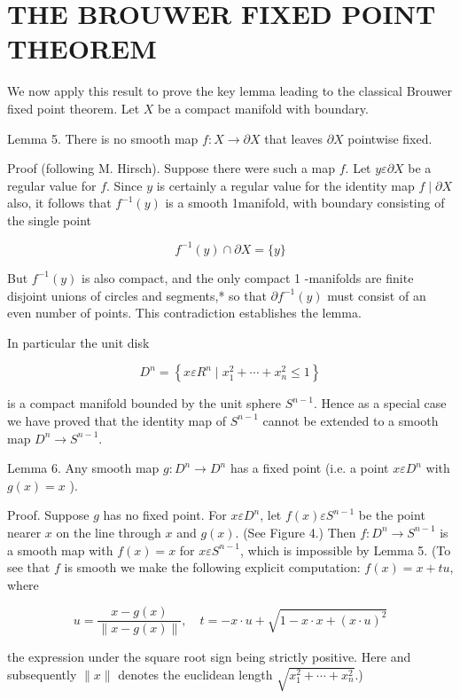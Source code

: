 \documentclass[10pt, letterpaper]{article}
\begin{document}
\section*{THE BROUWER FIXED POINT THEOREM}
We now apply this result to prove the key lemma leading to the classical Brouwer fixed point theorem. Let $X$ be a compact manifold with boundary.

Lemma 5. There is no smooth map $f: X \rightarrow \partial X$ that leaves $\partial X$ pointwise fixed.

Proof (following M. Hirsch). Suppose there were such a map $f$. Let $y \varepsilon \partial X$ be a regular value for $f$. Since $y$ is certainly a regular value for the identity map $f \mid \partial X$ also, it follows that $f^{-1}(y)$ is a smooth 1manifold, with boundary consisting of the single point

$$
f^{-1}(y) \cap \partial X=\{y\}
$$

But $f^{-1}(y)$ is also compact, and the only compact 1 -manifolds are finite disjoint unions of circles and segments,* so that $\partial f^{-1}(y)$ must consist of an even number of points. This contradiction establishes the lemma.

In particular the unit disk

$$
D^{n}=\left\{x \varepsilon R^{n} \mid x_{1}^{2}+\cdots+x_{n}^{2} \leq 1\right\}
$$

is a compact manifold bounded by the unit sphere $S^{n-1}$. Hence as a special case we have proved that the identity map of $S^{n-1}$ cannot be extended to a smooth map $D^{n} \rightarrow S^{n-1}$.

Lemma 6. Any smooth map $g: D^{n} \rightarrow D^{n}$ has a fixed point (i.e. a point $x \varepsilon D^{n}$ with $g(x)=x$ ).

Proof. Suppose $g$ has no fixed point. For $x \varepsilon D^{n}$, let $f(x) \varepsilon S^{n-1}$ be the point nearer $x$ on the line through $x$ and $g(x)$. (See Figure 4.) Then $f: D^{n} \rightarrow S^{n-1}$ is a smooth map with $f(x)=x$ for $x \varepsilon S^{n-1}$, which is impossible by Lemma 5. (To see that $f$ is smooth we make the following explicit computation: $f(x)=x+t u$, where

$$
u=\frac{x-g(x)}{\|x-g(x)\|}, \quad t=-x \cdot u+\sqrt{1-x \cdot x+(x \cdot u)^{2}}
$$

the expression under the square root sign being strictly positive. Here and subsequently $\|x\|$ denotes the euclidean length $\sqrt{x_{1}^{2}+\cdots+x_{n}^{2}}$.)
\end{document}
